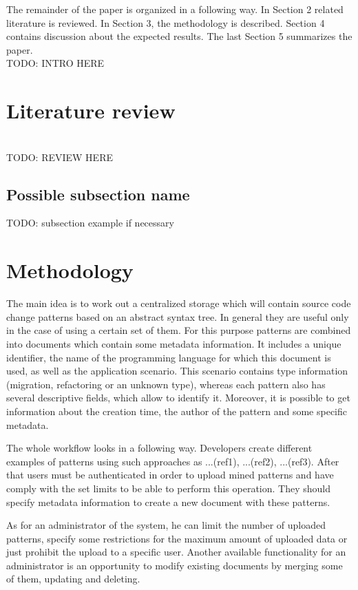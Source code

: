 \documentclass[letterpaper, 10 pt, conference]{ieeeconf}  %
\begin{document}
The remainder of the paper is organized in a following way. In
Section 2 related literature is reviewed. In Section 3, the
methodology is described. Section 4 contains discussion about the expected
results. The last Section 5 summarizes the paper.
\\ TODO: INTRO HERE

\section{Literature review}
\\ TODO: REVIEW HERE
\subsection{Possible subsection name}

TODO: subsection example if necessary

\section{Methodology}

The main idea is to work out a centralized storage which will contain
source code change patterns based on an abstract syntax tree. In
general they are useful only in the case of using a certain set of
them. For this purpose patterns are combined into documents which
contain some metadata information. It includes a unique identifier,
the name of the programming language for which this document is used,
as well as the application scenario. This scenario contains type
information (migration, refactoring or an unknown type), whereas each
pattern also has several descriptive fields, which allow to identify
it. Moreover, it is possible to get information about the creation
time, the author of the pattern and some specific metadata.

The whole workflow looks in a following way. Developers create
different examples of patterns using such approaches as ...(ref1),
...(ref2), ...(ref3). After that users must be authenticated in order
to upload mined patterns and have comply with the set limits to be
able to perform this operation. They should specify metadata
information to create a new document with these patterns. 

As for an administrator of the system, he can limit the number of
uploaded patterns, specify some restrictions for the maximum amount of
uploaded data or just prohibit the upload to a specific user. Another
available functionality for an administrator is an opportunity to
modify existing documents by merging some of them, updating and
deleting.
\end{document}
